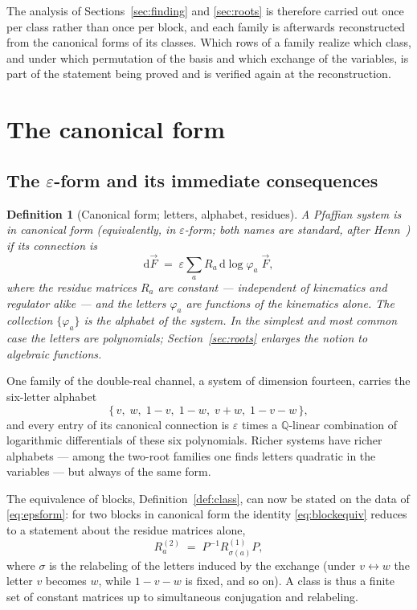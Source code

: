 \documentclass[11pt]{article}
\newcommand{\eps}{\varepsilon}
\newcommand{\dd}{\mathrm{d}}
\newcommand{\Q}{\mathbb{Q}}
\newtheorem{definition}{Definition}[section]
\begin{document}
The analysis of Sections~\ref{sec:finding} and \ref{sec:roots} is
therefore carried out once per class rather than once per block, and
each family is afterwards reconstructed from the canonical forms of
its classes.  Which rows of a family realize which class, and under
which permutation of the basis and which exchange of the variables, is
part of the statement being proved and is verified again at the
reconstruction.

\section{The canonical form}
\label{sec:epsform}

\subsection{The $\eps$-form and its immediate consequences}

\begin{definition}[Canonical form; letters, alphabet, residues]
A Pfaffian system is in \emph{canonical form} (equivalently, in
\emph{$\eps$-form}; both names are standard, after
Henn~\cite{henn}) if its connection is
\begin{equation}
  \dd \vec F \;=\; \eps \sum_{a} R_a \,\dd\log \varphi_a\;
  \vec F ,
  \label{eq:epsform}
\end{equation}
where the \emph{residue matrices} $R_a$ are constant --- independent
of kinematics and regulator alike --- and the \emph{letters}
$\varphi_a$ are functions of the kinematics alone.  The collection
$\{\varphi_a\}$ is the \emph{alphabet} of the system.  In the
simplest and most common case the letters are polynomials;
Section~\ref{sec:roots} enlarges the notion to algebraic functions.
\end{definition}

One family of the double-real channel, a system of dimension
fourteen, carries the six-letter alphabet
\begin{equation}
  \{\, v,\; w,\; 1-v,\; 1-w,\; v+w,\; 1-v-w \,\} ,
\end{equation}
and every entry of its canonical connection is $\eps$ times a
$\Q$-linear combination of logarithmic differentials of these six
polynomials.  Richer systems have richer alphabets --- among the
two-root families one finds letters quadratic in the variables ---
but always of the same form.

The equivalence of blocks, Definition~\ref{def:class}, can now be
stated on the data of \eqref{eq:epsform}: for two blocks in canonical
form the identity \eqref{eq:blockequiv} reduces to a statement about
the residue matrices alone,
\begin{equation}
  R^{(2)}_a \;=\; P^{-1} R^{(1)}_{\sigma(a)} P ,
  \label{eq:classresidues}
\end{equation}
where $\sigma$ is the relabeling of the letters induced by the
exchange (under $v \leftrightarrow w$ the letter $v$ becomes $w$,
while $1-v-w$ is fixed, and so on).  A class is thus a finite set of
constant matrices up to simultaneous conjugation and relabeling.
\end{document}
